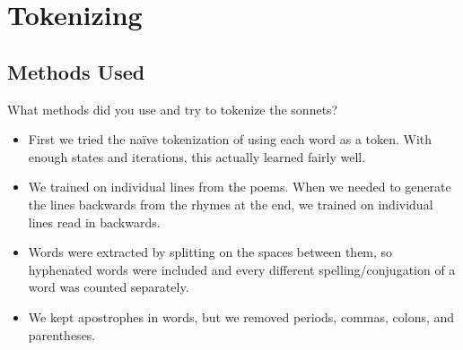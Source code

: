 \newif\ifshowsolutions
\showsolutionsfalse

\usepackage{listings}
\newcommand{\boldline}[1]{\underline{\textbf{#1}}}

\newcommand{\plotteddata}[3]{
  \begin{figure}[h]
  \caption{#1}
  \centering
  \texttt{[image: \#2]}
  \end{figure}
}



\pagestyle{fancy}

\section{Tokenizing}
\subsection{Methods Used}
What methods did you use and try to tokenize the sonnets?
\begin{itemize}
	\item First we tried the na\"ive tokenization of using each word as a token. With enough states and iterations, this actually learned fairly well.
  \item We trained on individual lines from the poems. When we needed to generate the lines backwards from the rhymes at the end, we trained on individual lines read in backwards.
  \item Words were extracted by splitting on the spaces between them, so hyphenated words were included and every different spelling/conjugation of a word was counted separately.
  \item We kept apostrophes in words, but we removed periods, commas, colons, and parentheses.
\end{itemize}

